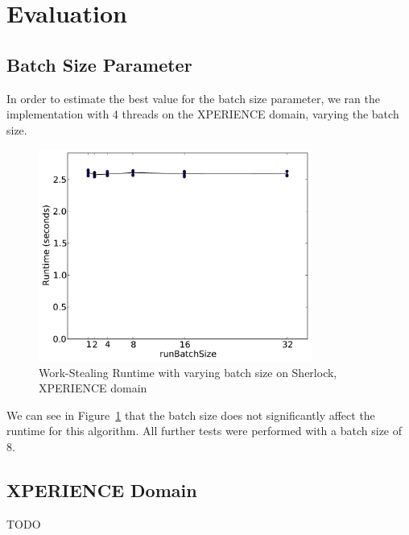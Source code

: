 \documentclass[12pt,twoside,abbrevs,msc,ai,notimes,logo,sansheadings]{infthesis}
\begin{document}
  \section{Evaluation}
  
  \subsection{Batch Size Parameter}
  
  In order to estimate the best value for the batch size parameter, we ran the implementation with 4 threads on the XPERIENCE domain, varying the batch size.
  
  \begin{figure}[!htbp]
  \begin{centering}
  \includegraphics[width=0.8\textwidth]{images/batch-xper5-sherlock-3-1}
  \par\end{centering}
  \caption{Work-Stealing Runtime with varying batch size on Sherlock, XPERIENCE domain}
  \label{fig:batch-3}
  \end{figure}
  
  We can see in Figure~\ref{fig:batch-3} that the batch size does not significantly affect the runtime for this algorithm. All further tests were performed with a batch size of 8.
  
  \subsection{XPERIENCE Domain}
  TODO
  
\end{document}
